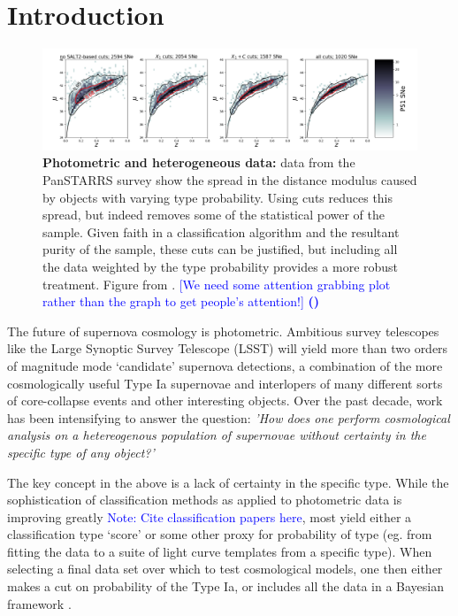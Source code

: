 \documentclass[12pt, twocolumn]{emulateapj}
\newcommand{\tkRH}[1]{\textcolor{blue}{#1}}  %
\begin{document}
\keywords{}

\maketitle

\section{Introduction}
\label{sec:intro}

\begin{figure}[htbp!]
\begin{center}
\includegraphics[width=1.0\textwidth]{fig/PanSTARRS.png}
\caption{{\bf Photometric and heterogeneous data:} data from the PanSTARRS survey show the spread in the distance modulus caused by objects with varying type probability.
Using cuts reduces this spread, but indeed removes some of the statistical power of the sample. 
Given faith in a classification algorithm and the resultant purity of the sample, these cuts can be justified, but including all the data weighted by the type probability provides a more robust treatment. 
Figure from \cite{Jones_2017}. \tkRH{[We need some attention grabbing plot rather than the graph to get people's attention!]  \textbf{()}}
\label{fig:intro}}
\end{center}
\end{figure}
The future of supernova cosmology is photometric.
Ambitious survey telescopes like the Large Synoptic Survey Telescope (LSST) will yield more than two orders of magnitude mode `candidate' supernova detections, a combination of the more cosmologically useful Type Ia supernovae and interlopers of many different sorts of core-collapse events and other interesting objects.
Over the past decade, work has been intensifying to answer the question: \textit{'How does one perform cosmological analysis on a hetereogenous population of supernovae without certainty in the specific type of any object?'} \citet{kunz_bayesian_2007, kelly_flexible_2008, hlozek_photometric_2012, Lochner_2013, newling_2012}

The key concept in the above is a lack of certainty in the specific type.
While the sophistication of classification methods as applied to photometric data is improving greatly \tkRH{Note: Cite classification papers here}, most yield either a classification type `score' or some other proxy for probability of type (eg. from fitting the data to a suite of light curve templates from a specific type).
When selecting a final data set over which to test cosmological models, one then either makes a cut on probability of the Type Ia, or includes all the data in a Bayesian framework \citet{kunz_bayesian_2007, kelly_flexible_2008, hlozek_photometric_2012, Lochner_2013, newling_2012}.
\end{document}
